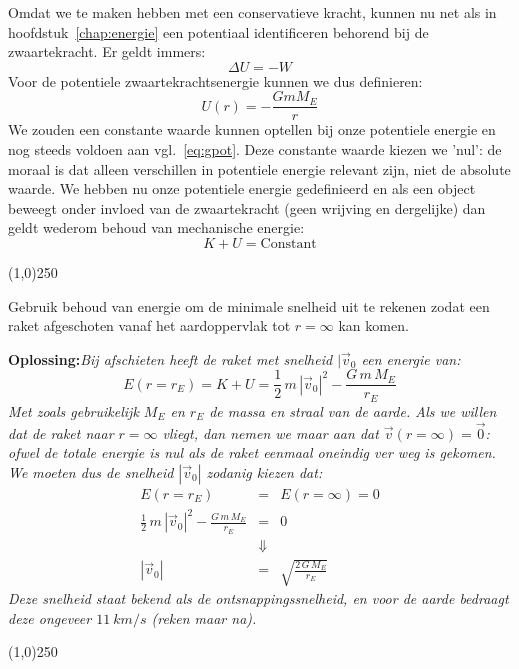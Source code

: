 Omdat we te maken hebben met een conservatieve kracht, kunnen nu net als in hoofdstuk~\ref{chap:energie} 
een potentiaal identificeren behorend bij de zwaartekracht. Er geldt immers:
\begin{equation}\label{eq:gpot}
\Delta U = -W
\end{equation}
Voor de potentiele zwaartekrachtsenergie kunnen we dus definieren:
\begin{equation}
U(r) = -\frac{G m M_E}{r}
\end{equation}
We zouden een constante waarde kunnen optellen bij onze potentiele energie en nog steeds voldoen
aan vgl.~\ref{eq:gpot}. Deze constante waarde kiezen we 'nul': de moraal is dat alleen verschillen
in potentiele energie relevant zijn, niet de absolute waarde.  We hebben nu onze potentiele energie gedefinieerd
en als een object beweegt onder invloed van de zwaartekracht (geen wrijving en dergelijke) dan
geldt wederom behoud van mechanische energie:
\begin{equation}
K+U=\mbox{Constant}
\end{equation}

\begin{center}
\line(1,0){250}
\end{center}
\begin{voorbeeld} 
Gebruik behoud van energie om de minimale snelheid uit te rekenen zodat een raket afgeschoten vanaf
het aardoppervlak tot $r=\infty$ kan komen.

{\bf Oplossing:}{\it Bij afschieten heeft de raket met snelheid $|\vec{v}_0$ een energie van:
\begin{equation}
E(r=r_E) = K + U = \frac{1}{2}\,m\,|\vec{v}_0|^2-\frac{G\,m\,M_E}{r_E} 
\end{equation}
Met zoals gebruikelijk $M_E$ en $r_E$ de massa en straal van de aarde. Als we willen dat de raket 
naar $r=\infty$ vliegt, dan nemen we maar aan dat $\vec{v}(r=\infty)=\vec{0}$: ofwel de totale energie
is nul als de raket eenmaal oneindig ver weg is gekomen. We moeten dus de snelheid $|\vec{v}_0|$ zodanig
kiezen dat:
\begin{eqnarray}
E(r=r_E) & = & E(r=\infty) = 0 \\
\frac{1}{2}\,m\,|\vec{v}_0|^2-\frac{G\,m\,M_E}{r_E}  & = & 0 \\
& \Downarrow & \\
|\vec{v}_0| & = & \sqrt{\frac{2\,G\,M_E}{r_E}}
\end{eqnarray}
Deze snelheid staat bekend als de ontsnappingssnelheid, en voor de aarde bedraagt deze ongeveer
$11~km/s$ ({\it reken maar na}).
}
\end{voorbeeld}
\begin{center}
\line(1,0){250}
\end{center}

